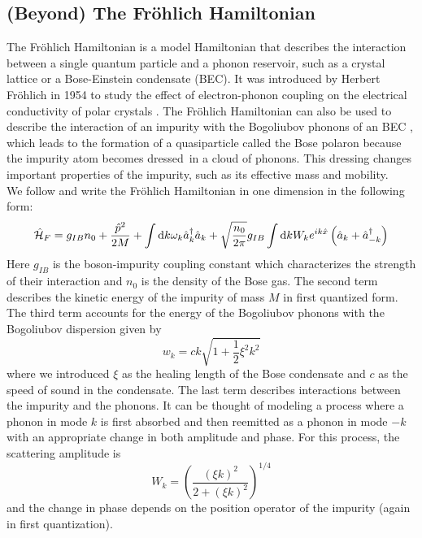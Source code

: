 \subsection{(Beyond) The Fröhlich Hamiltonian}\label{(Beyond) The Fröhlich Hamiltonian}
The Fröhlich Hamiltonian is a model Hamiltonian that describes the interaction between a single quantum particle and a phonon reservoir, such as a crystal lattice or a Bose-Einstein condensate (BEC). It was introduced by Herbert Fröhlich in 1954 to study the effect of electron-phonon coupling on the electrical conductivity of polar crystals \cite{doi:10.1080/00018735400101213}. The Fröhlich Hamiltonian can also be used to describe the interaction of an impurity with the Bogoliubov phonons of an BEC%
, which leads to the formation of a quasiparticle called the Bose polaron because the impurity atom becomes \grqq dressed\grqq\ in a cloud of phonons. This dressing changes important properties of the impurity, such as its effective mass and mobility.\\ 
We follow \cite{Grusdt_2017} and write the Fröhlich Hamiltonian in one dimension in the following form:
\begin{equation}\label{Fröhlich}
\hat{\mathcal{H}}_F = g_{IB}n_0+\frac{\hat p^2}{2M}+\int\mathrm d k\omega_{ k}\hat a^\dagger_{ k}\hat a_{ k}+\sqrt{\frac{n_0}{2\pi}}g_{IB}\int\mathrm d k W_k e^{ik\hat x}\left(\hat a_{ k}+\hat a^\dagger_{- k}\right)
\end{equation}
Here $g_{IB}$ is the boson-impurity coupling constant which characterizes the strength of their interaction and $n_0$ is the density of the Bose gas. The second term describes the kinetic energy of the impurity of mass $M$ in first quantized form. The third term accounts for the energy of the Bogoliubov phonons with the Bogoliubov dispersion given by 
\begin{equation}\label{bog_disp}
w_k=ck\sqrt{1+\frac12\xi^2k^2}
\end{equation}
where we introduced $\xi$ as the healing length of the Bose condensate and $c$ as the speed of sound in the condensate. The last term describes interactions between the impurity and the phonons. It can be thought of modeling a process where a phonon in mode $k$ is first absorbed and then reemitted as a phonon in mode $-k$ with an appropriate change in both amplitude and phase. For this process, the scattering amplitude is
\begin{equation}\label{W_k_def}
W_k = \left(\frac{(\xi k)^2}{2+(\xi k)^2}\right)^{1/4}
\end{equation}
and the change in phase depends on the position operator of the impurity (again in first quantization).\par

